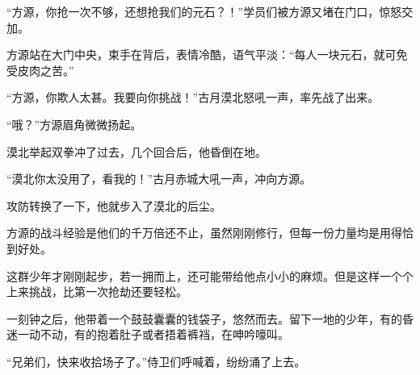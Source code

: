 \begin{this_body}
“方源，你抢一次不够，还想抢我们的元石？！”学员们被方源又堵在门口，惊怒交加。

方源站在大门中央，束手在背后，表情冷酷，语气平淡：“每人一块元石，就可免受皮肉之苦。”

“方源，你欺人太甚。我要向你挑战！”古月漠北怒吼一声，率先战了出来。

“哦？”方源眉角微微扬起。

漠北举起双拳冲了过去，几个回合后，他昏倒在地。

“漠北你太没用了，看我的！”古月赤城大吼一声，冲向方源。

攻防转换了一下，他就步入了漠北的后尘。

方源的战斗经验是他们的千万倍还不止，虽然刚刚修行，但每一份力量均是用得恰到好处。

这群少年才刚刚起步，若一拥而上，还可能带给他点小小的麻烦。但是这样一个个上来挑战，比第一次抢劫还要轻松。

一刻钟之后，他带着一个鼓鼓囊囊的钱袋子，悠然而去。留下一地的少年，有的昏迷一动不动，有的抱着肚子或者捂着裤裆，在呻吟嚎叫。

“兄弟们，快来收拾场子了。”侍卫们呼喊着，纷纷涌了上去。

\end{this_body}

